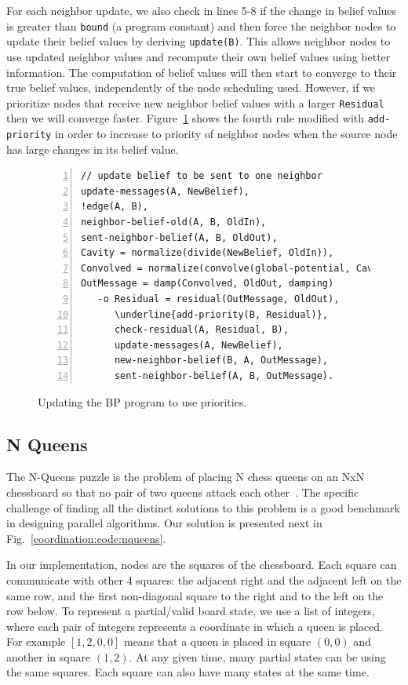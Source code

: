 For each neighbor update, we also check in lines 5-8 if the change in belief
values is greater than \texttt{bound} (a program constant) and then force the
neighbor nodes to update their belief values by deriving \texttt{update(B)}.
This allows neighbor nodes to use updated neighbor values and recompute their
own belief values using better information. The computation of belief values
will then start to converge to their true belief values, independently of the
node scheduling used. However, if we prioritize nodes that receive new neighbor
belief values with a larger \texttt{Residual} then we will converge faster.
Figure~\ref{code:coordination:improved_bp} shows the fourth rule modified with
\texttt{add-priority} in order to increase to priority of neighbor nodes when
the source node has large changes in its belief value.

\begin{figure}[h!]
\begin{Verbatim}[numbers=left,commandchars=\\\{\},fontsize=\scriptsize]
// update belief to be sent to one neighbor
update-messages(A, NewBelief),
!edge(A, B),
neighbor-belief-old(A, B, OldIn),
sent-neighbor-belief(A, B, OldOut),
Cavity = normalize(divide(NewBelief, OldIn)),
Convolved = normalize(convolve(global-potential, Cavity)),
OutMessage = damp(Convolved, OldOut, damping)
   -o Residual = residual(OutMessage, OldOut),
      \underline{add-priority(B, Residual)},
      check-residual(A, Residual, B),
      update-messages(A, NewBelief),
      new-neighbor-belief(B, A, OutMessage),
      sent-neighbor-belief(A, B, OutMessage).
\end{Verbatim}
\caption{Updating the BP program to use priorities.}
\label{code:coordination:improved_bp}
\end{figure}

\subsection{N Queens}

The N-Queens puzzle is the problem of placing N chess queens on an NxN
chessboard so that no pair of two queens attack each
other~\cite{8queens}. The specific challenge of finding all the
distinct solutions to this problem is a good benchmark in designing
parallel algorithms.  Our solution is presented next in
Fig.~\ref{coordination:code:nqueens}.

In our implementation, nodes are the squares of the chessboard. Each
square can communicate with other 4 squares: the adjacent right and
the adjacent left on the same row, and the first non-diagonal square
to the right and to the left on the row below. To represent a
partial/valid board state, we use a list of integers, where each pair
of integers represents a coordinate in which a queen is placed. For
example $[1, 2, 0, 0]$ means that a queen is placed in square $(0, 0)$
and another in square $(1, 2)$. At any given time, many partial states
can be using the same squares. Each square can also have many states
at the same time.

